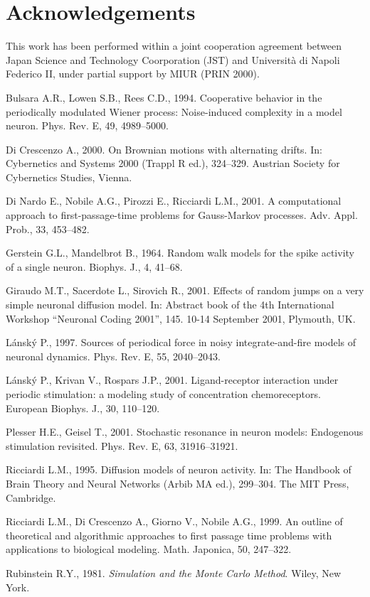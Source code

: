 \section*{Acknowledgements}
This work has been performed within a joint cooperation agreement between Japan Science
and Technology Coorporation (JST) and Universit\`a di Napoli Federico II, under partial
support by MIUR (PRIN 2000).
\begin{thebibliography}{99}
\item
Bulsara A.R., Lowen S.B., Rees C.D., 1994. 
Cooperative behavior in the periodically modulated Wiener process: 
Noise-induced complexity in a model neuron. 
Phys. Rev. E, 49, 4989--5000.
\item
Di Crescenzo A., 2000. On Brownian motions with alternating drifts.
In: Cybernetics and Systems 2000 (Trappl R ed.), 324--329.
Austrian Society for Cybernetics Studies, Vienna.
\item
Di Nardo E., Nobile A.G., Pirozzi E., Ricciardi L.M., 2001.
A computational approach to first-passage-time problems for Gauss-Markov processes.
Adv. Appl. Prob., 33, 453--482.
\item
Gerstein G.L., Mandelbrot B., 1964.
Random walk models for the spike activity of a single neuron.
Biophys. J., 4, 41--68.
\item
Giraudo M.T., Sacerdote L., Sirovich R., 2001.
Effects of random jumps on a very simple neuronal diffusion model.
In: Abstract book of the 4th International Workshop ``Neuronal Coding 2001'', 145.
10-14 September 2001, Plymouth, UK.
\item
L\'ansk\'y P., 1997. 
Sources of periodical force in noisy integrate-and-fire models of 
neuronal dynamics. 
Phys. Rev. E, 55, 2040--2043.
\item
L\'ansk\'y P., Krivan V., Rospars J.P., 2001. 
Ligand-receptor interaction under periodic stimulation: a modeling study 
of concentration chemoreceptors. 
European Biophys. J., 30, 110--120. 
\item
Plesser H.E., Geisel T., 2001. 
Stochastic resonance in neuron models: Endogenous stimulation revisited. 
Phys. Rev. E, 63, 31916--31921.
\item
Ricciardi L.M., 1995.
Diffusion models of neuron activity.
In: The Handbook of Brain Theory and Neural Networks (Arbib MA ed.), 299--304.
The MIT Press, Cambridge.
\item
Ricciardi L.M., Di Crescenzo A., Giorno V., Nobile A.G., 1999.
An outline of theoretical and algorithmic approaches to first passage
time problems with applications to biological modeling.
Math. Japonica, 50, 247--322.
\item
Rubinstein R.Y., 1981. {\em Simulation and the Monte Carlo Method\/}.
Wiley, New York.
%
\end{thebibliography}
